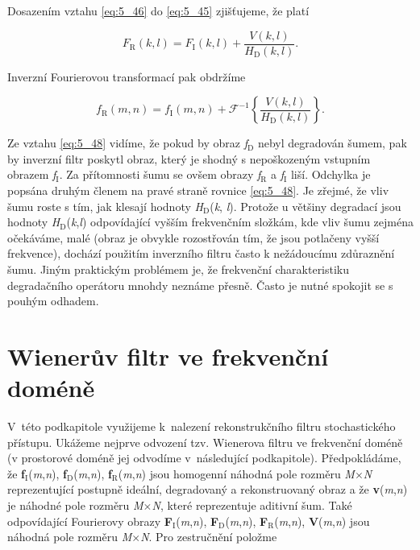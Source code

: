 Dosazením vztahu \eqref{eq:5_46} do \eqref{eq:5_45} zjišťujeme, že platí

\begin{equation} \label{eq:5_47}
    F_\mathrm{R} (k, l) = F_\mathrm{I} (k, l) + \frac{V(k, l)}{H_\mathrm{D}(k, l)}.
\end{equation}

Inverzní Fourierovou transformací pak obdržíme

\begin{equation} \label{eq:5_48}
    f_\mathrm{R} (m, n) = f_\mathrm{I} (m, n) + \mathscr{F}^{-1} \left\{ \frac{V(k, l)}{H_\mathrm{D}(k, l)} \right\}.
\end{equation}

Ze vztahu \eqref{eq:5_48} vidíme, že pokud by obraz \textit{f}$_\mathrm{D}$ nebyl degradován šumem, pak by inverzní filtr poskytl obraz, který je shodný s nepoškozeným vstupním obrazem \textit{f}$_\mathrm{I}$. Za přítomnosti šumu se ovšem obrazy \textit{f}$_\mathrm{R}$ a \textit{f}$_\mathrm{I}$ liší. Odchylka je popsána druhým členem na pravé straně rovnice \eqref{eq:5_48}. Je zřejmé, že vliv šumu roste s tím, jak klesají hodnoty \textit{H}$_\mathrm{D}$(\textit{k}, \textit{l}). Protože u většiny degradací jsou hodnoty \textit{H}$_\mathrm{D}$(\textit{k},\textit{l}) odpovídající vyšším frekvenčním složkám, kde vliv šumu zejména očekáváme, malé (obraz je obvykle rozostřován tím, že jsou potlačeny vyšší frekvence), dochází použitím inverzního filtru často k nežádoucímu zdůraznění šumu. Jiným praktickým problémem je, že frekvenční charakteristiku degradačního operátoru mnohdy neznáme přesně. Často je nutné spokojit se s pouhým odhadem.

\section*{Wienerův filtr ve frekvenční doméně}

V~této podkapitole využijeme k~nalezení rekonstrukčního filtru stochastického přístupu. Ukážeme nejprve odvození tzv. Wienerova filtru ve frekvenční doméně (v prostorové doméně jej odvodíme v~následující podkapitole). Předpokládáme, že \textbf{f}$_\mathrm{I}$(\textit{m},\textit{n}), \textbf{f}$_\mathrm{D}$(\textit{m},\textit{n}), \textbf{f}$_\mathrm{R}$(\textit{m},\textit{n}) jsou homogenní náhodná pole rozměru \textit{M}$\times$\textit{N} reprezentující postupně ideální, degradovaný a rekonstruovaný obraz a že \textbf{v}(\textit{m},\textit{n}) je náhodné pole rozměru \textit{M}$\times$\textit{N}, které reprezentuje aditivní šum. Také odpovídající Fourierovy obrazy \textbf{F}$_\mathrm{I}$(\textit{m},\textit{n}), \textbf{F}$_\mathrm{D}$(\textit{m},\textit{n}), \textbf{F}$_\mathrm{R}$(\textit{m},\textit{n}), \textbf{V}(\textit{m},\textit{n}) jsou náhodná pole rozměru \textit{M}$\times$\textit{N}. Pro zestručnění položme

